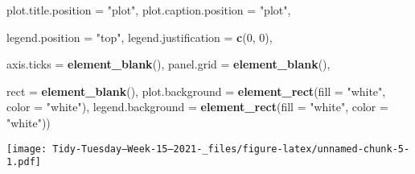 \documentclass[
]{article}
\newenvironment{Shaded}{\begin{snugshade}}{\end{snugshade}}
\newcommand{\DataTypeTok}[1]{\textcolor[rgb]{0.13,0.29,0.53}{#1}}
\newcommand{\DecValTok}[1]{\textcolor[rgb]{0.00,0.00,0.81}{#1}}
\newcommand{\KeywordTok}[1]{\textcolor[rgb]{0.13,0.29,0.53}{\textbf{#1}}}
\newcommand{\NormalTok}[1]{#1}
\newcommand{\StringTok}[1]{\textcolor[rgb]{0.31,0.60,0.02}{#1}}
\begin{document}
\begin{Shaded}
\begin{Highlighting}[]
        \DataTypeTok{plot.title.position =} \StringTok{"plot"}\NormalTok{,}
        \DataTypeTok{plot.caption.position =} \StringTok{"plot"}\NormalTok{,}
  
        \DataTypeTok{legend.position =} \StringTok{"top"}\NormalTok{,}
        \DataTypeTok{legend.justification =} \KeywordTok{c}\NormalTok{(}\DecValTok{0}\NormalTok{, }\DecValTok{0}\NormalTok{),}
    
        \DataTypeTok{axis.ticks =} \KeywordTok{element\_blank}\NormalTok{(),}
        \DataTypeTok{panel.grid =} \KeywordTok{element\_blank}\NormalTok{(),}
    
        \DataTypeTok{rect =} \KeywordTok{element\_blank}\NormalTok{(),}
        \DataTypeTok{plot.background =} \KeywordTok{element\_rect}\NormalTok{(}\DataTypeTok{fill =} \StringTok{"white"}\NormalTok{, }\DataTypeTok{color =} \StringTok{"white"}\NormalTok{),}
        \DataTypeTok{legend.background =} \KeywordTok{element\_rect}\NormalTok{(}\DataTypeTok{fill =} \StringTok{"white"}\NormalTok{, }\DataTypeTok{color =} \StringTok{"white"}\NormalTok{))}
\end{Highlighting}
\end{Shaded}

\texttt{[image: Tidy-Tuesday---Week-15--2021-\_files/figure-latex/unnamed-chunk-5-1.pdf]}
\end{document}
